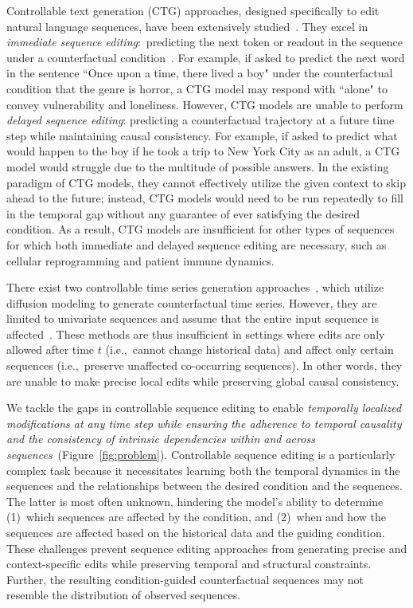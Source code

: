 Controllable text generation (CTG) approaches, designed specifically to edit natural language sequences, have been extensively studied~\cite{zhang2023survey}. They excel in \textit{immediate sequence editing}:~predicting the next token or readout in the sequence under a counterfactual condition~\cite{niu2024mitigating, gu2024token, zhou2024virtual, chatzi2024counterfactual, zhang2023survey, bhattacharjee2024zero}. For example, if asked to predict the next word in the sentence ``Once upon a time, there lived a boy" under the counterfactual condition that the genre is horror, a CTG model may respond with ``alone" to convey vulnerability and loneliness. However, CTG models are unable to perform \textit{delayed sequence editing}: predicting a counterfactual trajectory at a future time step while maintaining causal consistency. For example, if asked to predict what would happen to the boy if he took a trip to New York City as an adult, a CTG model would struggle due to the multitude of possible answers. In the existing paradigm of CTG models, they cannot effectively utilize the given context to skip ahead to the future; instead, CTG models would need to be run repeatedly to fill in the temporal gap without any guarantee of ever satisfying the desired condition. As a result, CTG models are insufficient for other types of sequences for which both immediate and delayed sequence editing are necessary, such as cellular reprogramming and patient immune dynamics.


There exist two controllable time series generation approaches~\cite{jing2024towards, bao2024towards}, which utilize diffusion modeling to generate counterfactual time series. However, they are limited to univariate sequences and assume that the entire input sequence is affected~\cite{jing2024towards, bao2024towards}. These methods are thus insufficient in settings where edits are only allowed after time $t$ (i.e.,~cannot change historical data) and affect only certain sequences (i.e.,~preserve unaffected co-occurring sequences). In other words, they are unable to make precise local edits while preserving global causal consistency.



%
We tackle the gaps in controllable sequence editing to enable \textit{temporally localized modifications at any time step while ensuring the adherence to temporal causality and the consistency of intrinsic dependencies within and across sequences}~(Figure~\ref{fig:problem}). Controllable sequence editing is a particularly complex task because it necessitates learning both the temporal dynamics in the sequences and the relationships between the desired condition and the sequences. The latter is most often unknown, hindering the model's ability to determine (1)~which sequences are affected by the condition, and (2)~when and how the sequences are affected based on the historical data and the guiding condition. These challenges prevent sequence editing approaches from generating precise and context-specific edits while preserving temporal and structural constraints. Further, the resulting condition-guided counterfactual sequences may not resemble the distribution of observed sequences. 



